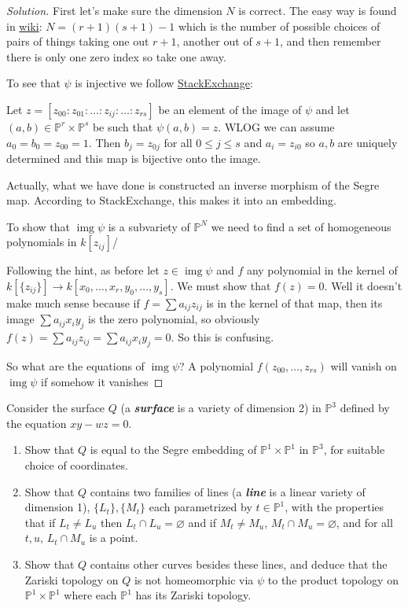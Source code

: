 \documentclass{article}
\renewcommand{\P}{\mathbb{P}}
\DeclareMathOperator{\img}{img}
\begin{document}
\begin{proof}[Solution]
	First let's make sure the dimension $N$ is correct. The easy way is found in \href{https://en.wikipedia.org/wiki/Segre_embedding}{wiki}: $N=(r+1)(s+1)-1$ which is the number of possible choices of pairs of things taking one out $r+1$, another out of $s+1$, and then remember there is only one zero index so take one away.
	
	To see that $\psi$ is injective we follow \href{https://math.stackexchange.com/questions/3683364/segre-map-is-an-embedding}{StackExchange}: 
	{\color{azure}Let $z=[z_{00}:z_{01}:\ldots:z_{ij}:\ldots:z_{rs}]$ be an element of the image of $\psi$ and let $(a,b)\in\P^r\times\P^s$ be such that $\psi(a,b)=z$. WLOG we can assume $a_0=b_0=z_{00}=1$. Then $b_j=z_{0j}$ for all $0\leq j\leq s$ and $a_i=z_{i0}$ so $a,b$ are uniquely determined and this map is bijective onto the image.
	
	Actually, what we have done is constructed an inverse morphism of the Segre map. According to StackExchange, this makes it into an embedding.}
	
	To show that $\img\psi$ is a subvariety of $\P^N$ we need to find a set of homogeneous polynomials in $k[z_{ij}]$/
	
	Following the hint, as before let $z\in\img\psi$ and $f$ any polynomial in the kernel of $k[\{z_{ij}\}]\to k[x_0,\ldots,x_r,y_0,\ldots,y_s]$. We must show that $f(z)=0$. Well it doesn't make much sense because if $f=\sum a_{ij}z_{ij}$ is in the kernel of that map, then its image $\sum a_{ij}x_iy_j$ is the zero polynomial, so obviously $f(z)=\sum a_{ij}z_{ij}=\sum a_{ij}x_iy_j=0$. So this is confusing.
	
	So what are the equations of $\img\psi$? A polynomial $f(z_{00},\ldots,z_{rs})$ will vanish on $\img\psi$ if somehow it vanishes 
\end{proof}
\begin{exercise}[2.15, The Quadric Surface in $\P^3$.]
	Consider the surface $Q$ (a \textbf{\textit{surface}} is a variety of dimension 2) in $\P^3$ defined by the equation $xy-wz=0$.
	\begin{enumerate}
		\item Show that $Q$ is equal to the Segre embedding of $\P^1\times\P^1$ in $\P^3$, for suitable choice of coordinates.
		\item Show that $Q$ contains two families of lines (a \textbf{\textit{line}} is a linear variety of dimension 1), $\{L_t\},\{M_t\}$ each parametrized by $t\in\P^1$, with the properties that if $L_t\neq L_u$ then $L_t\cap L_u=\varnothing$ and if $M_t\neq M_u$, $M_t\cap M_u=\varnothing$, and for all $t,u$, $L_t\cap M_u$ is a point.
		\item Show that $Q$ contains other curves besides these lines, and deduce that the Zariski topology on $Q$ is not homeomorphic via $\psi$ to the product topology on $\P^1\times \P^1$ where each $\P^1$ has its Zariski topology.
	\end{enumerate}
\end{exercise}
\end{document}
